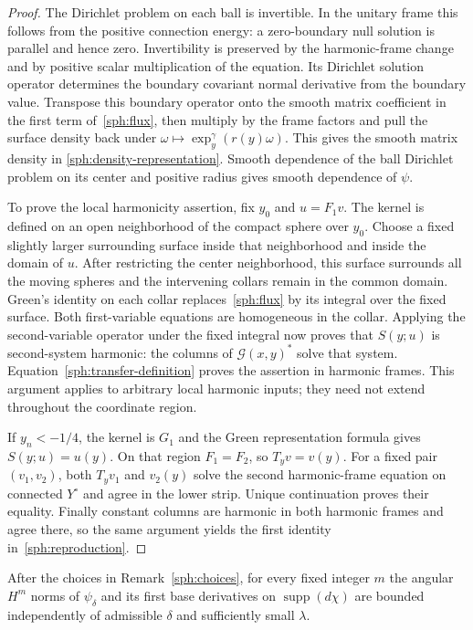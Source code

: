 \begin{proof}
The Dirichlet problem on each ball is invertible.  In the unitary
frame this follows from the positive connection energy: a zero-boundary
null solution is parallel and hence zero.  Invertibility is preserved
by the harmonic-frame change and by positive scalar multiplication of
the equation.  Its Dirichlet solution operator determines the boundary
covariant normal derivative from the boundary value.  Transpose this
boundary operator onto the smooth matrix coefficient in the first term
of~\eqref{sph:flux}, then multiply by the frame factors and pull the
surface density back under $\omega\mapsto\exp_y^\gamma(r(y)\omega)$.
This gives the smooth matrix density in
\eqref{sph:density-representation}.  Smooth dependence of the ball
Dirichlet problem on its center and positive radius gives smooth
dependence of $\psi$.

To prove the local harmonicity assertion, fix $y_0$ and $u=F_1v$.
The kernel is defined on an open neighborhood of the compact sphere
over $y_0$.  Choose a fixed slightly larger surrounding surface inside
that neighborhood and inside the domain of $u$.  After restricting
the center neighborhood, this surface surrounds all the moving
spheres and the intervening collars remain in the common domain.
Green's identity on each collar replaces~\eqref{sph:flux} by its
integral over the fixed surface.  Both first-variable equations are
homogeneous in the collar.  Applying the second-variable operator
under the fixed integral now proves that $S(y;u)$ is second-system
harmonic: the columns of $\mathcal G(x,y)^*$ solve that system.
Equation~\eqref{sph:transfer-definition} proves the assertion in
harmonic frames.  This argument applies to arbitrary local harmonic
inputs; they need not extend throughout the coordinate region.

If $y_n<-1/4$, the kernel is $G_1$ and the Green representation formula
gives $S(y;u)=u(y)$.  On that region $F_1=F_2$, so $T_yv=v(y)$.
For a fixed pair $(v_1,v_2)$, both $T_yv_1$ and $v_2(y)$ solve the
second harmonic-frame equation on connected $Y^\circ$ and agree in
the lower strip.  Unique continuation proves their equality.
Finally constant columns are harmonic in both harmonic frames and
agree there, so the same argument yields the first identity
in~\eqref{sph:reproduction}.
\end{proof}

\begin{lemma}\label{sph:cutoff-bounds}
After the choices in Remark~\ref{sph:choices}, for every fixed integer
$m$ the angular $H^m$ norms of $\psi_\delta$ and its first base
derivatives on $\operatorname{supp}(d\chi)$ are bounded independently
of admissible $\delta$ and sufficiently small $\lambda$.
\end{lemma}

